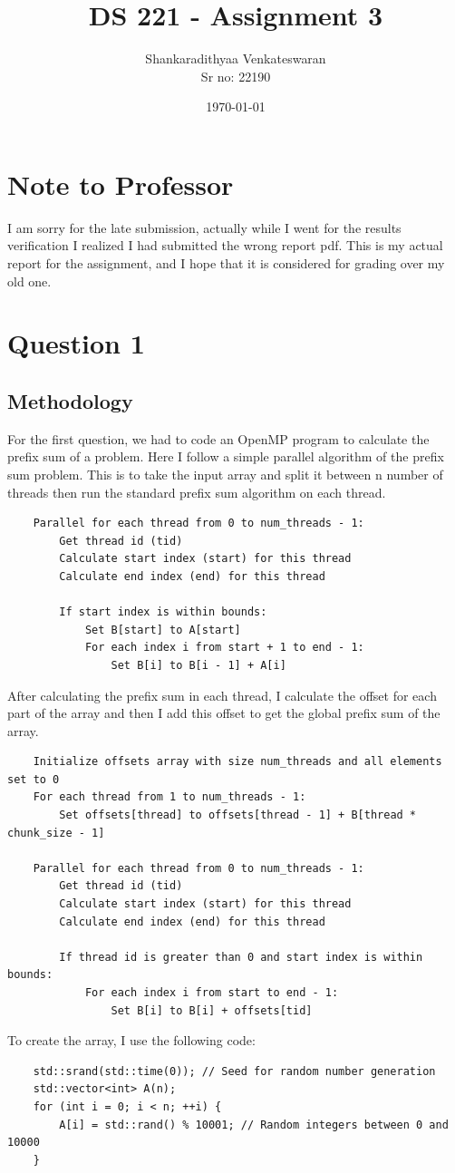 \documentclass[12pt]{article}
\title{DS 221 - Assignment 3}
\author{Shankaradithyaa Venkateswaran\\ Sr no: 22190}
\date{\today}
\begin{document}
\begin{titlepage}
    \maketitle
\end{titlepage}

\section*{Note to Professor}
I am sorry for the late submission, actually while I went for the results verification I realized I had submitted the wrong report pdf. This is my actual report for the assignment, and I hope that it is considered for grading over my old one.

\section*{Question 1}
\subsection*{Methodology}
For the first question, we had to code an OpenMP program to calculate the prefix sum of a problem. Here I follow a simple parallel algorithm of the prefix sum problem. This is to take the input array and split it between n number of threads then run the standard prefix sum algorithm on each thread.
\begin{verbatim}
    Parallel for each thread from 0 to num_threads - 1:
        Get thread id (tid)
        Calculate start index (start) for this thread
        Calculate end index (end) for this thread

        If start index is within bounds:
            Set B[start] to A[start]
            For each index i from start + 1 to end - 1:
                Set B[i] to B[i - 1] + A[i]
\end{verbatim}
After calculating the prefix sum in each thread, I calculate the offset for each part of the array and then I add this offset to get the global prefix sum of the array.
\begin{verbatim}
    Initialize offsets array with size num_threads and all elements set to 0
    For each thread from 1 to num_threads - 1:
        Set offsets[thread] to offsets[thread - 1] + B[thread * chunk_size - 1]

    Parallel for each thread from 0 to num_threads - 1:
        Get thread id (tid)
        Calculate start index (start) for this thread
        Calculate end index (end) for this thread

        If thread id is greater than 0 and start index is within bounds:
            For each index i from start to end - 1:
                Set B[i] to B[i] + offsets[tid]
\end{verbatim}
To create the array, I use the following code:
\begin{verbatim}
    std::srand(std::time(0)); // Seed for random number generation
    std::vector<int> A(n);
    for (int i = 0; i < n; ++i) {
        A[i] = std::rand() % 10001; // Random integers between 0 and 10000
    }
\end{verbatim}
\end{document}
